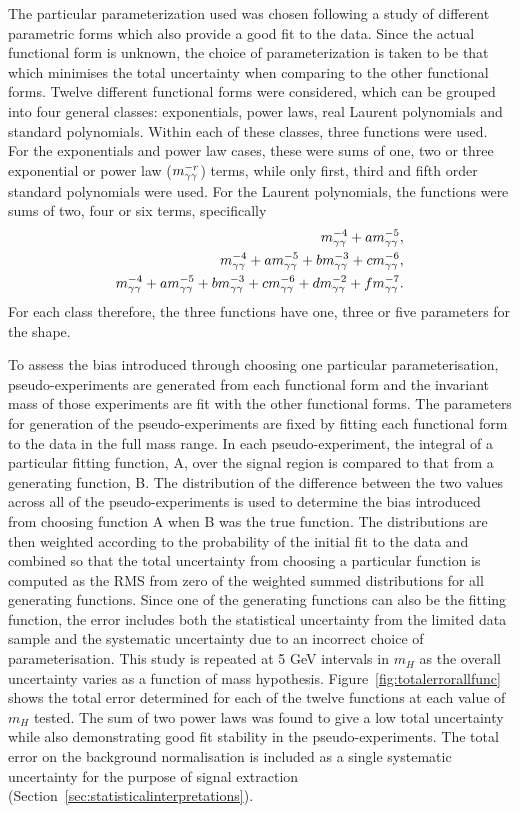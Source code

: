 The particular parameterization used was chosen following a study of different parametric forms which also provide a good
fit to the data. Since the actual functional form is unknown, the choice of parameterization is taken to be
that which minimises the total uncertainty when comparing to the other functional forms.
Twelve different functional forms were considered, which can be grouped into four general classes:
exponentials, power laws, real Laurent polynomials and standard polynomials. Within each of these
classes, three functions were used. For the exponentials and power law cases, these were sums
of one, two or three exponential or power law ($m_{\gamma\gamma}^{-r}$) terms, while only first, third and fifth order
standard polynomials were used. 
For the Laurent polynomials, the functions were sums of two, four or six terms, specifically
\begin{eqnarray*}
m_{\gamma\gamma}^{-4}+am_{\gamma\gamma}^{-5},\\
m_{\gamma\gamma}^{-4}+am_{\gamma\gamma}^{-5}+bm_{\gamma\gamma}^{-3}+cm_{\gamma\gamma}^{-6},\\
m_{\gamma\gamma}^{-4}+am_{\gamma\gamma}^{-5}+bm_{\gamma\gamma}^{-3}+cm_{\gamma\gamma}^{-6}+dm_{\gamma\gamma}^{-2}+fm_{\gamma\gamma}^{-7}.
\end{eqnarray*}
For each class therefore, the three functions have one, three or five parameters for the shape.

To assess the bias introduced through choosing one particular parameterisation, pseudo-experiments are
generated from each functional form and the invariant mass of those experiments are
fit with the other functional forms. The parameters for generation of the pseudo-experiments are 
fixed by fitting each functional form to the data in the full mass range.
In each pseudo-experiment, the integral of a particular fitting function, A, over the signal region is 
compared to that from a generating function, B. The distribution of the difference between the two values
across all of the pseudo-experiments is used to determine the bias introduced from choosing function A when B was the true function. 
The distributions are then weighted according to the probability of the initial fit to the data 
and combined so that the total uncertainty from choosing a particular function is computed as the RMS from 
zero of the weighted summed distributions for all generating functions. Since one of the generating functions
can also be the fitting function, the error includes both the statistical uncertainty from the limited data sample
and the systematic uncertainty due to an incorrect choice of parameterisation.
This study is repeated at 5 GeV intervals in $m_{H}$ as the overall uncertainty varies as a function of 
mass hypothesis. Figure~\ref{fig:totalerrorallfunc} shows the total error determined for each of the twelve functions 
at each value of $m_{H}$ tested. The sum of two power laws was found to give a low total uncertainty while also demonstrating 
good fit stability in the pseudo-experiments. The total error on the background normalisation
is included as a single systematic uncertainty for the purpose of signal extraction
(Section~\ref{sec:statisticalinterpretations}).

